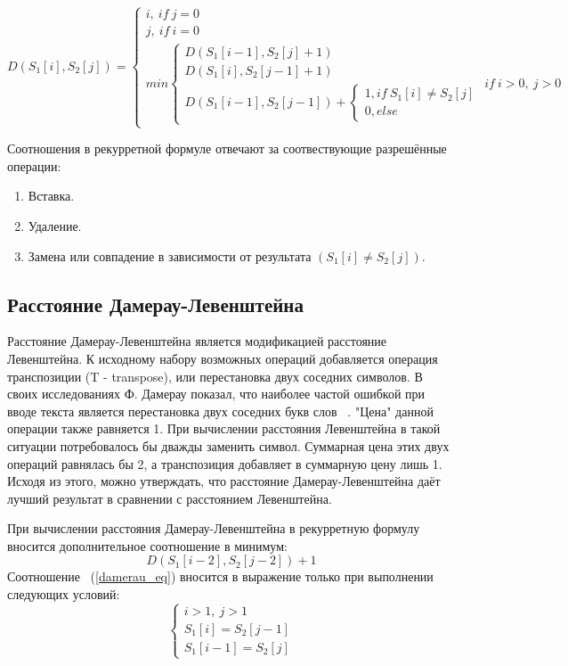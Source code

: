 \documentclass[12pt, a4paper]{report}
\begin{document}
	\begin{equation}
	\label{formula_leven}
	D(S_{1}[i], S_{2}[j]) =
		\begin{cases}
		i, \ if\ j = 0\\
		j, \ if\ i = 0\\
		min \begin{cases}
		D(S_{1}[i-1], S_{2}[j] + 1)\\
		D(S_{1}[i], S_{2}[j-1]+1)\\
		D(S_{1}[i-1], S_{2}[j-1])+
			\begin{cases}
				1, if\  S_{1}[i] \neq S_{2}[j]\\
				0, else
			\end{cases}
		\end{cases} if\  i > 0,\  j > 0
	\end{cases}
	\end{equation}
	
	Соотношения в рекурретной формуле отвечают за соотвествующие разрешённые операции:
	\begin{enumerate}
		\item Вставка.
		\item Удаление.
		\item Замена или совпадение в зависимости от результата $(S_{1}[i] \neq S_{2}[j])$.	
	\end{enumerate}

	\subsection{Расстояние Дамерау-Левенштейна}
	Расстояние Дамерау-Левенштейна является модификацией расстояние Левенштейна. К исходному набору возможных операций добавляется операция транспозиции (T - transpose), или перестановка двух соседних символов. В своих исследованиях Ф. Дамерау показал, что наиболее частой ошибкой при вводе текста является перестановка двух соседних букв слов ~\cite{damerau}. "Цена" данной операции также равняется 1. При вычислении расстояния Левенштейна в такой ситуации потребовалось бы дважды заменить символ. Суммарная цена этих двух операций равнялась бы 2, а транспозиция добавляет в суммарную цену лишь 1. Исходя из этого, можно утверждать, что расстояние Дамерау-Левенштейна даёт лучший результат в сравнении с расстоянием Левенштейна.
	
	При вычислении расстояния Дамерау-Левенштейна в рекурретную формулу вносится дополнительное соотношение в минимум:
	\begin{equation}
	\label{damerau_eq}
	D(S_{1}[i-2], S_{2}[j-2])+1
	\end{equation}
	Соотношение ~(\ref{damerau_eq}) вносится в выражение только при выполнении следующих условий:
	\begin{equation}
	\label{damerau_conditions}
	\begin{cases}
		i > 1,\ j > 1\\
		S_{1}[i] = S_{2}[j-1]\\
		S_{1}[i-1] = S_{2}[j]
	\end{cases}	
	\end{equation}
	
\end{document}
